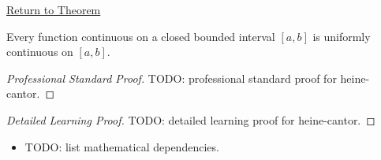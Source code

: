 \newpage
{}
\label{prf:heine-cantor}

\begin{remark*}[Return]
\hyperref[thm:heine-cantor]{Return to Theorem}
\end{remark*}

\begin{theorem*}
Every function continuous on a closed bounded interval $[a,b]$ is uniformly continuous on $[a,b]$.
\end{theorem*}

\begin{proof}[Professional Standard Proof]
\LRAProofBodyStart
TODO: professional standard proof for heine-cantor.
\end{proof}

\begin{proof}[Detailed Learning Proof]
\LRAProofBodyStart
TODO: detailed learning proof for heine-cantor.
\end{proof}

\begin{remark*}
\end{remark*}

\begin{dependencies}
\begin{itemize}
  \item TODO: list mathematical dependencies.
\end{itemize}
\end{dependencies}

\clearpage
